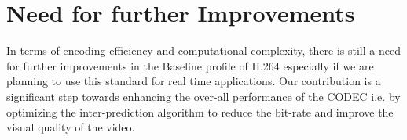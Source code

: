 \section{Need for further Improvements}

In terms of encoding efficiency and computational complexity, there is still a need for further improvements in the Baseline profile of H.264 especially if we are planning to use this standard for real time applications. Our contribution is a significant step towards enhancing the over-all performance of the CODEC i.e. by optimizing the inter-prediction algorithm to reduce the bit-rate and improve the visual quality of the video. 


